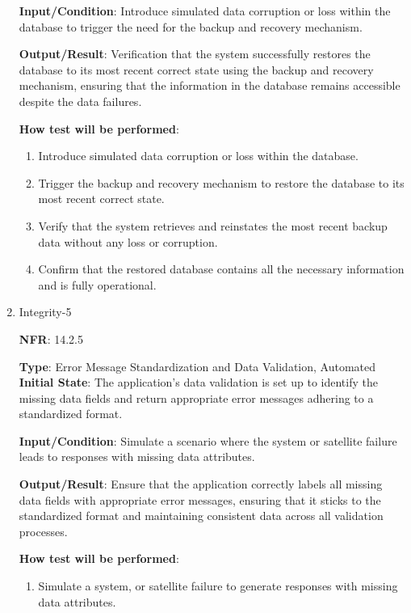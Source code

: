 \documentclass[12pt, titlepage]{article}
\begin{document}
\begin{enumerate}
\textbf{Input/Condition}: Introduce simulated data corruption or loss within the database to trigger the need for the backup and recovery mechanism.





\textbf{Output/Result}: Verification that the system successfully restores the database to its most recent correct state using the backup and recovery mechanism, ensuring that the information in the database remains accessible despite the data failures.



\textbf{How test will be performed}: 
\begin{enumerate}
    \item Introduce simulated data corruption or loss within the database.


    \item Trigger the backup and recovery mechanism to restore the database to its most recent correct state.


    \item Verify that the system retrieves and reinstates the most recent backup data without any loss or corruption.


    \item Confirm that the restored database contains all the necessary information and is fully operational.


\end{enumerate}

\item {Integrity-5\\}

\textbf{NFR}: 14.2.5

\textbf{Type}: Error Message Standardization and Data Validation, Automated
\textbf{Initial State}: The application's data validation is set up to identify the missing data fields and return appropriate error messages adhering to a standardized format.


\textbf{Input/Condition}: Simulate a scenario where the system or satellite failure leads to responses with missing data attributes.


\textbf{Output/Result}: Ensure that the application correctly labels all missing data fields with appropriate error messages, ensuring that it sticks to the standardized format and maintaining consistent data across all validation processes.


\textbf{How test will be performed}: 
\begin{enumerate}
    \item Simulate a system, or satellite failure to generate responses with missing data attributes.




\end{enumerate}
\end{enumerate}
\end{document}
